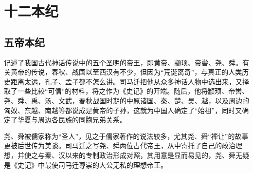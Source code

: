 \documentclass[12pt,UTF8]{ctexbook}
\begin{document}
\mainmatter
\part{十二本纪}

\chapter{五帝本纪}

记述了我国古代神话传说中的五个圣明的帝王，即黄帝、颛顼、帝喾、尧、舜。有关黄帝的传说，春秋、战国以至西汉有不少，但因为“荒诞离奇”，与真正的人类历史距离太远，孔子、孟子都不怎么讲。司马迁把他从众多神话人物中选出来，又择取了一些比较“可信”的材料，将之作为《史记》的开端。随后，他将颛顼、帝喾、尧、舜、禹、汤、文武，春秋战国时期的中原诸国、秦、楚、吴、越，以及周边的匈奴、东越、南越等都说成是黄帝的子孙，这就为中国人确定了“始祖”，同时又确定了华夏与周边各民族的同胞兄弟关系。

尧、舜被儒家称为“圣人”，见之于儒家著作的说法较多，尤其尧、舜“禅让”的故事更被后世传为美谈。司马迁之写尧、舜两位古代帝王，从中寄托了自己的政治理想，并使之与秦、汉以来的专制政治形成对照，其用意是显而易见的，尧、舜无疑是《史记》中最使司马迁尊崇的大公无私的理想帝王。
\end{document}
